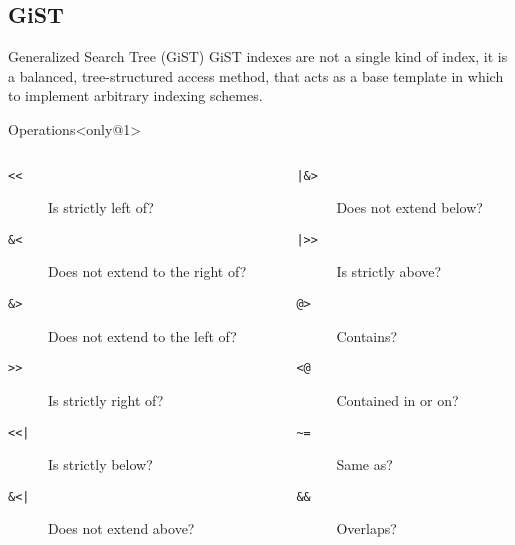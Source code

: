 \subsection{GiST}
\begin{frame}[fragile]{Generalized Search Tree (GiST)}
    GiST indexes are not a single kind of index, it is a balanced, tree-structured access method, that acts as a base template in which to implement arbitrary indexing schemes.

    \begin{block}{Operations}<only@1>
        \begin{columns}[t]
            \begin{column}{.5\textwidth}
                \begin{description}
                    \item[\texttt{<}\texttt{<}] Is strictly left of?
                    \item[\texttt{\&}\texttt{<}] Does not extend to the right of?
                    \item[\texttt{\&}\texttt{>}] Does not extend to the left of?
                    \item[\texttt{>}\texttt{>}] Is strictly right of?
                    \item[\texttt{<}\texttt{<}\texttt{|}] Is strictly below?
                    \item[\texttt{\&}\texttt{<}\texttt{|}] Does not extend above?
                \end{description}
            \end{column}
            \begin{column}{.5\textwidth}
                \begin{description}
                    \item[\texttt{|}\texttt{\&}\texttt{>}] Does not extend below?
                    \item[\texttt{|}\texttt{>}\texttt{>}] Is strictly above?
                    \item[\texttt{@}\texttt{>}] Contains?
                    \item[\texttt{<}\texttt{@}] Contained in or on?
                    \item[\texttt{\textasciitilde}\texttt{=}] Same as?
                    \item[\texttt{\&}\texttt{\&}] Overlaps?
                \end{description}
            \end{column}
        \end{columns}
    \end{block}


\end{frame}
